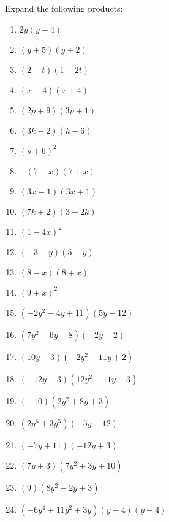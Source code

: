 \begin{exercises}{}
{
Expand the following products:
\begin{multicols}{2}
\begin{enumerate}[label=\textbf{\arabic*}., itemsep=5pt]
\item $2y(y+4)$ 
\item $(y+5)(y+2) $
\item $(2-t)(1-2t)$
\item $(x-4)(x+4)$
\item $ (2p+9)(3p+1)$
\item $(3k-2)(k+6)$
\item $(s+6)^2$
\item $-(7-x)(7+x)$
\item $(3x-1)(3x+1)$
\item $(7k+2)(3-2k)$
\item $(1-4x)^2$
\item $(-3-y)(5-y)$
\item $(8-x)(8+x)$
\item $(9+x)^2$
\item $(-2{y}^{2}-4y+11)(5y-12)$ 
\item $(7{y}^{2}-6y-8)(-2y+2)$%
\item $(10{y}+3)(-2{y}^{2}-11y+2)$ 
\item $(-12y-3)(12{y}^{2}-11y+3)$%
\item $(-10)(2{y}^{2}+8y+3)$ 
\item $(2{y}^{6}+3{y}^{5})(-5y-12)$%
\item $(-7y+11)(-12y+3)$%
\item $(7y+3)(7{y}^{2}+3y+10)$%
\item $(9)(8{y}^{2}-2y+3)$ 
\item $(-6{y}^{4}+11{y}^{2}+3y)(y+4)(y-4)$ 
\end{enumerate}
\end{multicols}

}
\end{exercises}


